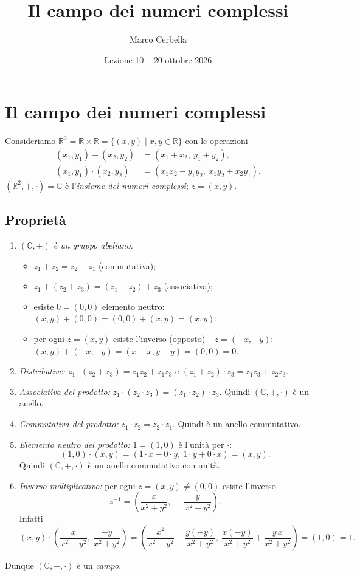 \documentclass[11pt,a4paper]{article}
\title{Il campo dei numeri complessi}
\author{Marco Cerbella}
\date{Lezione 10 -- 20 ottobre 2026}
\begin{document}
\maketitle

\section{Il campo dei numeri complessi}

Consideriamo $\mathbb{R}^2 = \mathbb{R}\times\mathbb{R} = \{(x, y) \mid x, y \in \mathbb{R}\}$ con le operazioni
\begin{align*}
  (x_1, y_1) + (x_2, y_2) &= (x_1 + x_2,\ y_1 + y_2),\\
  (x_1, y_1)\cdot(x_2, y_2) &= (x_1 x_2 - y_1 y_2,\ x_1 y_2 + x_2 y_1).
\end{align*}
$(\mathbb{R}^2, +, \cdot) = \mathbb{C}$ è l'\emph{insieme dei numeri complessi}; $z = (x, y)$.

\subsection{Proprietà}

\begin{enumerate}
  \item \emph{$(\mathbb{C}, +)$ è un gruppo abeliano.}
  \begin{itemize}
    \item $z_1 + z_2 = z_2 + z_1$ (commutativa);
    \item $z_1 + (z_2 + z_3) = (z_1 + z_2) + z_3$ (associativa);
    \item esiste $0 = (0, 0)$ elemento neutro: $(x, y) + (0, 0) = (0, 0) + (x, y) = (x, y)$;
    \item per ogni $z = (x, y)$ esiste l'inverso (opposto) $-z = (-x, -y)$: $(x, y) + (-x, -y) = (x - x, y - y) = (0, 0) = 0$.
  \end{itemize}
  \item \emph{Distributive:} $z_1\cdot(z_2 + z_3) = z_1 z_2 + z_1 z_3$ e $(z_1 + z_2)\cdot z_3 = z_1 z_3 + z_2 z_3$.
  \item \emph{Associativa del prodotto:} $z_1\cdot(z_2\cdot z_3) = (z_1\cdot z_2)\cdot z_3$. Quindi $(\mathbb{C}, +, \cdot)$ è un anello.
  \item \emph{Commutativa del prodotto:} $z_1 \cdot z_2 = z_2 \cdot z_1$. Quindi è un anello commutativo.
  \item \emph{Elemento neutro del prodotto:} $1 = (1, 0)$ è l'unità per $\cdot$:
  \[
    (1, 0)\cdot(x, y) = (1\cdot x - 0\cdot y,\ 1\cdot y + 0\cdot x) = (x, y).
  \]
  Quindi $(\mathbb{C}, +, \cdot)$ è un anello commutativo con unità.
  \item \emph{Inverso moltiplicativo:} per ogni $z = (x, y) \neq (0, 0)$ esiste l'inverso
  \[
    z^{-1} = \left( \frac{x}{x^2 + y^2},\ -\frac{y}{x^2 + y^2} \right).
  \]
  Infatti
  \[
    (x, y)\cdot\left( \frac{x}{x^2+y^2},\ \frac{-y}{x^2+y^2} \right)
    = \left( \frac{x^2}{x^2+y^2} - \frac{y(-y)}{x^2+y^2},\ \frac{x(-y)}{x^2+y^2} + \frac{y\,x}{x^2+y^2} \right) = (1, 0) = 1 .
  \]
\end{enumerate}
Dunque $(\mathbb{C}, +, \cdot)$ è un \emph{campo}.
\end{document}
